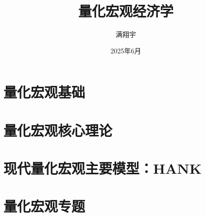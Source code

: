 \documentclass[12pt,oneside,openright]{book}
\title{\Huge\bfseries 量化宏观经济学}
\author{\LARGE 满翔宇}
\date{\vspace{5cm}\Large 2025年6月}
\begin{document}
%

\frontmatter

\pagestyle{frontstyle}

% 
\maketitle
% 
% 

\tableofcontents
%


\mainmatter
\pagestyle{mainstyle}

\part{量化宏观基础}









\part{量化宏观核心理论}






\part{现代量化宏观主要模型：HANK}





\part{量化宏观专题}






\backmatter

\appendix



%
%

\printbibliography[title={参考文献}]
\end{document}
